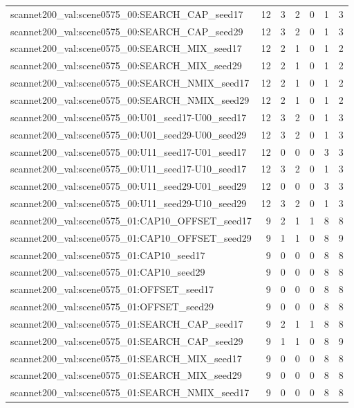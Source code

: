 \begin{table}[t]
\begin{tabular}{lrrrrrr}
scannet200\_val:scene0575\_00:SEARCH\_CAP\_seed17 & 12 & 3 & 2 & 0 & 1 & 3 \\
scannet200\_val:scene0575\_00:SEARCH\_CAP\_seed29 & 12 & 3 & 2 & 0 & 1 & 3 \\
scannet200\_val:scene0575\_00:SEARCH\_MIX\_seed17 & 12 & 2 & 1 & 0 & 1 & 2 \\
scannet200\_val:scene0575\_00:SEARCH\_MIX\_seed29 & 12 & 2 & 1 & 0 & 1 & 2 \\
scannet200\_val:scene0575\_00:SEARCH\_NMIX\_seed17 & 12 & 2 & 1 & 0 & 1 & 2 \\
scannet200\_val:scene0575\_00:SEARCH\_NMIX\_seed29 & 12 & 2 & 1 & 0 & 1 & 2 \\
scannet200\_val:scene0575\_00:U01\_seed17-U00\_seed17 & 12 & 3 & 2 & 0 & 1 & 3 \\
scannet200\_val:scene0575\_00:U01\_seed29-U00\_seed29 & 12 & 3 & 2 & 0 & 1 & 3 \\
scannet200\_val:scene0575\_00:U11\_seed17-U01\_seed17 & 12 & 0 & 0 & 0 & 3 & 3 \\
scannet200\_val:scene0575\_00:U11\_seed17-U10\_seed17 & 12 & 3 & 2 & 0 & 1 & 3 \\
scannet200\_val:scene0575\_00:U11\_seed29-U01\_seed29 & 12 & 0 & 0 & 0 & 3 & 3 \\
scannet200\_val:scene0575\_00:U11\_seed29-U10\_seed29 & 12 & 3 & 2 & 0 & 1 & 3 \\
scannet200\_val:scene0575\_01:CAP10\_OFFSET\_seed17 & 9 & 2 & 1 & 1 & 8 & 8 \\
scannet200\_val:scene0575\_01:CAP10\_OFFSET\_seed29 & 9 & 1 & 1 & 0 & 8 & 9 \\
scannet200\_val:scene0575\_01:CAP10\_seed17 & 9 & 0 & 0 & 0 & 8 & 8 \\
scannet200\_val:scene0575\_01:CAP10\_seed29 & 9 & 0 & 0 & 0 & 8 & 8 \\
scannet200\_val:scene0575\_01:OFFSET\_seed17 & 9 & 0 & 0 & 0 & 8 & 8 \\
scannet200\_val:scene0575\_01:OFFSET\_seed29 & 9 & 0 & 0 & 0 & 8 & 8 \\
scannet200\_val:scene0575\_01:SEARCH\_CAP\_seed17 & 9 & 2 & 1 & 1 & 8 & 8 \\
scannet200\_val:scene0575\_01:SEARCH\_CAP\_seed29 & 9 & 1 & 1 & 0 & 8 & 9 \\
scannet200\_val:scene0575\_01:SEARCH\_MIX\_seed17 & 9 & 0 & 0 & 0 & 8 & 8 \\
scannet200\_val:scene0575\_01:SEARCH\_MIX\_seed29 & 9 & 0 & 0 & 0 & 8 & 8 \\
scannet200\_val:scene0575\_01:SEARCH\_NMIX\_seed17 & 9 & 0 & 0 & 0 & 8 & 8 \\

\end{tabular}
\end{table}
